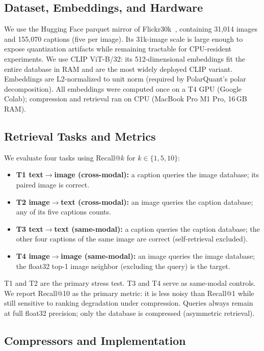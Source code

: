 \documentclass[11pt]{article}
\begin{document}
\subsection{Dataset, Embeddings, and Hardware}

We use the Hugging Face parquet mirror of Flickr30k~\cite{young2014flickr}, containing 31{,}014 images
and 155{,}070 captions (five per image). Its 31k-image scale is large enough to expose quantization
artifacts while remaining tractable for CPU-resident experiments. We use CLIP ViT-B/32: its
512-dimensional embeddings fit the entire database in RAM and are the most widely deployed CLIP variant.
Embeddings are L2-normalized to unit norm (required by PolarQuant's polar decomposition). All embeddings
were computed once on a T4 GPU (Google Colab); compression and retrieval ran on CPU (MacBook Pro M1 Pro,
16\,GB RAM).

\subsection{Retrieval Tasks and Metrics}

We evaluate four tasks using Recall@$k$ for $k \in \{1, 5, 10\}$:
\begin{itemize}[itemsep=1pt]
  \item \textbf{T1 text$\to$image (cross-modal):} a caption queries the image database; its paired image is correct.
  \item \textbf{T2 image$\to$text (cross-modal):} an image queries the caption database; any of its five captions counts.
  \item \textbf{T3 text$\to$text (same-modal):} a caption queries the caption database; the other four captions of the same image are correct (self-retrieval excluded).
  \item \textbf{T4 image$\to$image (same-modal):} an image queries the image database; the float32 top-1 image neighbor (excluding the query) is the target.
\end{itemize}

T1 and T2 are the primary stress test. T3 and T4 serve as same-modal controls.
We report Recall@10 as the primary metric: it is less noisy than Recall@1 while still sensitive to
ranking degradation under compression. Queries always remain at full float32 precision; only the database
is compressed (asymmetric retrieval).

\subsection{Compressors and Implementation}
\end{document}
